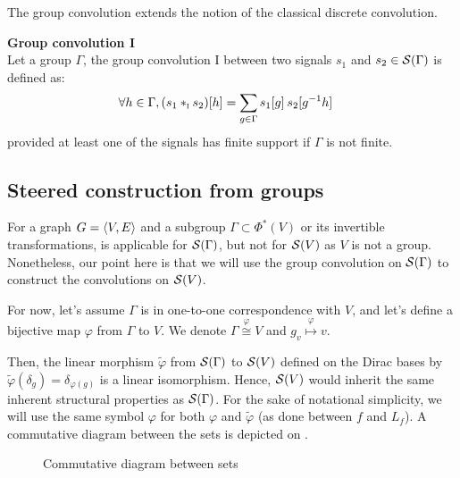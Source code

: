 The group convolution extends the notion of the classical discrete convolution.

\begin{definition}\textbf{Group convolution I}\\
Let a group $\Gamma$, the group convolution I between two signals $s_1$ and $s_2 \in \mathcal{S}(\Gamma)$ is defined as:
\begin{align*}
\forall h \in \Gamma, (s_1 \ast_{\I} s_2)[h] & = \displaystyle \sum_{g \in \Gamma} s_1[g] \h{2} s_2[g^{-1}h]%
\end{align*}
provided at least one of the signals has finite support if $\Gamma$ is not finite.
\label{def:conv1}
\end{definition}

\subsection{Steered construction from groups}

For a graph $G = \langle V, E \rangle$ and a subgroup $\Gamma \subset \Phi^*(V)$ or its invertible transformations,  is applicable for $\mathcal{S}(\Gamma)$, but not for $\mathcal{S}(V)$ as $V$ is not a group. Nonetheless, our point here is that we will use the group convolution on $\mathcal{S}(\Gamma)$ to construct the convolutions on $\mathcal{S}(V)$.

For now, let's assume $\Gamma$ is in one-to-one correspondence with $V$, and let's define a bijective map $\varphi$ from $\Gamma$ to $V$. We denote $\Gamma \overset{\varphi}{\cong} V$ and $g_v \overset{\varphi}\mapsto v$.

Then, the linear morphism $\widetilde\varphi$ from $\mathcal{S}(\Gamma)$ to $\mathcal{S}(V)$ defined on the Dirac bases by $\widetilde\varphi(\delta_g) = \delta_{\varphi(g)}$ is a linear isomorphism. Hence, $\mathcal{S}(V)$ would inherit the same inherent structural properties as $\mathcal{S}(\Gamma)$. For the sake of notational simplicity, we will use the same symbol $\varphi$ for both $\varphi$ and $\widetilde\varphi$ (as done between $f$ and $L_f$). A commutative diagram between the sets is depicted on .

\begin{figure}[H]
\centering
{}%
\caption{Commutative diagram between sets}
\label{fig:iso}
\end{figure}

